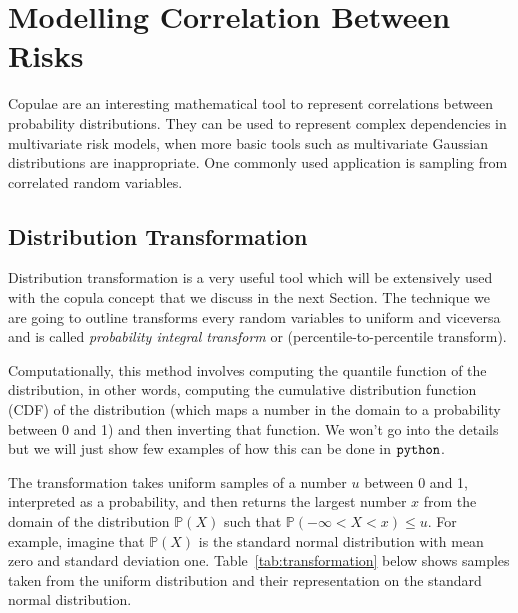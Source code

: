 \chapter{Modelling Correlation Between Risks}

Copulae are an interesting mathematical tool to represent correlations between probability distributions. They can be used to represent complex dependencies in multivariate risk models, when more basic tools such as multivariate Gaussian distributions are inappropriate. One commonly used application is sampling from correlated random variables.

\section{Distribution Transformation}\label{distribution-transformation}

Distribution transformation is a very useful tool which will be
extensively used with the copula concept that we discuss in the next
Section. The technique we are going to outline transforms every random
variables to uniform and viceversa and is called
\emph{probability integral transform} or (percentile-to-percentile
transform).

Computationally, this method involves computing the quantile function of
the distribution, in other words, computing the cumulative
distribution function (CDF) of the distribution (which maps a number in
the domain to a probability between 0 and 1) and then inverting that
function. We won't go into the details but we will just show few
examples of how this can be done in \(\tt{python}\).

The transformation takes uniform samples of a number \(u\) between 0 and
1, interpreted as a probability, and then returns the largest number
\(x\) from the domain of the distribution \(\mathbb{P}(X)\) such that
\(\mathbb{P}(-\infty <X<x)\le u\). For example, imagine that
\(\mathbb{P}(X)\) is the standard normal distribution with mean zero and
standard deviation one. Table~\ref{tab:transformation} below shows samples taken from the
uniform distribution and their representation on the standard normal
distribution.

